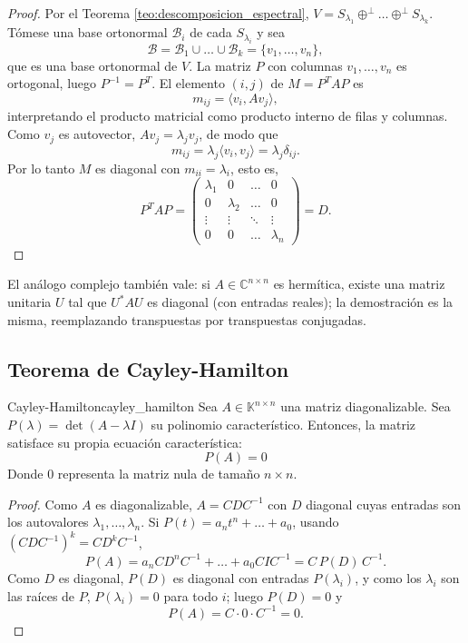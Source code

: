 \documentclass[11pt, a4paper]{article}
\begin{document}
\begin{proof}
Por el Teorema \ref{teo:descomposicion_espectral}, $V = S_{\lambda_1} \oplus^\perp \dots \oplus^\perp S_{\lambda_k}$. Tómese una base ortonormal $\mathcal{B}_i$ de cada $S_{\lambda_i}$ y sea
\[ \mathcal{B} = \mathcal{B}_1 \cup \dots \cup \mathcal{B}_k = \{ v_1, \dots, v_n \}, \]
que es una base ortonormal de $V$. La matriz $P$ con columnas $v_1, \dots, v_n$ es ortogonal, luego $P^{-1} = P^T$. El elemento $(i,j)$ de $M = P^T A P$ es
\[ m_{ij} = \langle v_i, A v_j \rangle, \]
interpretando el producto matricial como producto interno de filas y columnas. Como $v_j$ es autovector, $A v_j = \lambda_j v_j$, de modo que
\[ m_{ij} = \lambda_j \langle v_i, v_j \rangle = \lambda_j \delta_{ij}. \]
Por lo tanto $M$ es diagonal con $m_{ii} = \lambda_i$, esto es,
\[ P^T A P = \begin{pmatrix} \lambda_1 & 0 & \dots & 0 \\ 0 & \lambda_2 & \dots & 0 \\ \vdots & \vdots & \ddots & \vdots \\ 0 & 0 & \dots & \lambda_n \end{pmatrix} = D. \]
\end{proof}

\obs El análogo complejo también vale: si $A \in \mathbb{C}^{n \times n}$ es hermítica, existe una matriz unitaria $U$ tal que $U^* A U$ es diagonal (con entradas reales); la demostración es la misma, reemplazando transpuestas por transpuestas conjugadas.

\subsection{Teorema de Cayley-Hamilton}

\begin{teorema}{Cayley-Hamilton}{cayley_hamilton}
Sea $A \in \mathbb{K}^{n \times n}$ una matriz diagonalizable.
Sea $P(\lambda) = \det(A - \lambda I)$ su polinomio característico.
Entonces, la matriz satisface su propia ecuación característica:
\[ P(A) = 0 \]
Donde $0$ representa la matriz nula de tamaño $n \times n$.
\end{teorema}

\begin{proof}
Como $A$ es diagonalizable, $A = C D C^{-1}$ con $D$ diagonal cuyas entradas son los autovalores $\lambda_1, \dots, \lambda_n$. Si $P(t) = a_n t^n + \dots + a_0$, usando $(C D C^{-1})^k = C D^k C^{-1}$,
\[ P(A) = a_n C D^n C^{-1} + \dots + a_0 C I C^{-1} = C\, P(D)\, C^{-1}. \]
Como $D$ es diagonal, $P(D)$ es diagonal con entradas $P(\lambda_i)$, y como los $\lambda_i$ son las raíces de $P$, $P(\lambda_i) = 0$ para todo $i$; luego $P(D) = 0$ y
\[ P(A) = C \cdot 0 \cdot C^{-1} = 0. \]
\end{proof}
\end{document}
